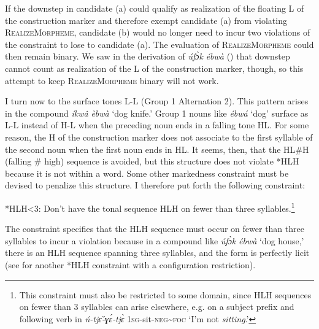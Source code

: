 \documentclass[output=paper]{langscibook}
\begin{document}
If the downstep in candidate (a) could qualify as realization of the floating L of the construction marker and therefore exempt candidate (a) from violating \textsc{RealizeMorpheme,} candidate (b) would no longer need to incur two violations of the constraint to lose to candidate (a). The evaluation of \textsc{RealizeMorpheme} could then remain binary. We saw in the derivation of \textit{úfɔ̀k} \textit{ébwà} () that downstep cannot count as realization of the L of the construction marker, though, so this attempt to keep \textsc{RealizeMorpheme} binary will not work.   

I turn now to the surface tones L-L (Group 1 Alternation 2). This pattern arises in the compound \textit{íkwâ} \textit{èbwà} ‘dog knife.’ Group 1 nouns like \textit{ébwá} ‘dog’ surface as L-L instead of H-L when the preceding noun ends in a falling tone HL. For some reason, the H of the construction marker does not associate to the first syllable of the second noun when the first noun ends in HL. It seems, then, that the HL\#H (falling \# high) sequence is avoided, but this structure does not violate *HLH because it is not within a word. Some other markedness constraint must be devised to penalize this structure. I therefore put forth the following constraint: 

\ea \label{ex:glewwe:5}
{*HLH<3: Don’t have the tonal sequence HLH on fewer than three syllables.\footnote{This constraint must also be restricted to some domain, since HLH sequences on fewer than 3 syllables can arise elsewhere, e.g. on a subject prefix and following verb in \textit{ń-tjɛ̌‑ɣɛ́‑tjɛ̀} \textsc{1sg-}sit\textsc{-neg{\textasciitilde}foc} ‘I’m not \textit{sitting}.’} }\\
\z

The constraint specifies that the HLH sequence must occur on fewer than three syllables to incur a violation because in a compound like \textit{úfɔ̀k} \textit{ébwà} ‘dog house,’ there is an HLH sequence spanning three syllables, and the form is perfectly licit (see \citealt{McPherson2016c} for another *HLH constraint with a configuration restriction). 
\end{document}
